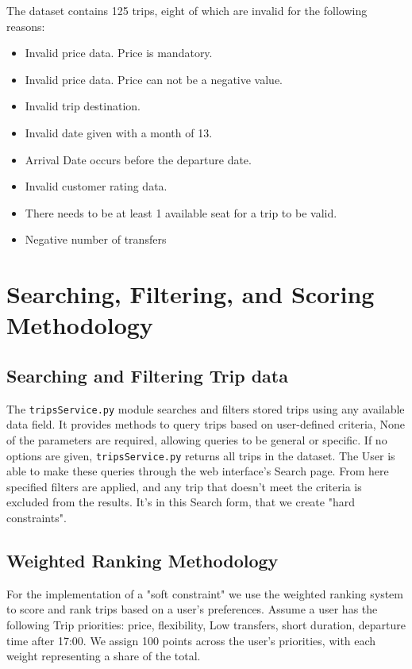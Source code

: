 ﻿\documentclass[11pt]{article}
\begin{document}
The dataset contains 125 trips, eight of which are invalid for the following reasons:
\begin{itemize}[nosep]
  \item Invalid price data. Price is mandatory.
  \item Invalid price data. Price can not be a negative value.
  \item Invalid trip destination.
  \item Invalid date given with a month of 13.
  \item Arrival Date occurs before the departure date.
  \item Invalid customer rating data.
  \item There needs to be at least 1 available seat for a trip to be valid.
  \item Negative number of transfers
\end{itemize}

\section{Searching, Filtering, and Scoring Methodology}
\subsection{Searching and Filtering Trip data}
The \texttt{tripsService.py} module searches and filters stored trips using any available data field. It provides methods to query trips based on user-defined criteria,
None of the parameters are required, allowing queries to be general or specific.
If no options are given, \texttt{tripsService.py} returns all trips in the dataset.
The User is able to make these queries through the web interface's Search page. 
From here specified filters are applied, and any trip that doesn't meet the criteria is excluded from the results.
It's in this Search form, that we create "hard constraints".

\subsection{Weighted Ranking Methodology}
For the implementation of a "soft constraint" we use the weighted ranking system to score and rank trips based on a user's preferences.
Assume a user has the following Trip priorities:
price, flexibility, Low transfers, short duration, departure time after 17:00. We assign 100 points across the user’s priorities, 
with each weight representing a share of the total.
\end{document}
